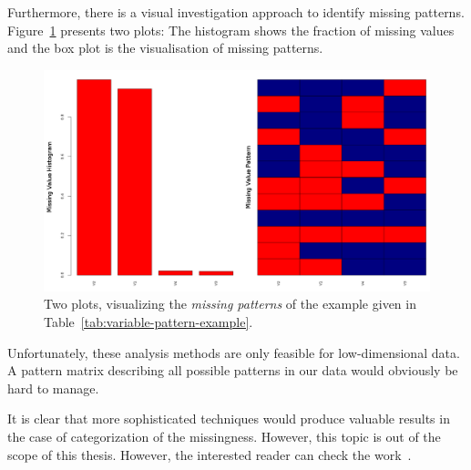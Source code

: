 Furthermore, there is a visual investigation approach to identify missing patterns. Figure~\ref{fig:missing-plot} presents two plots: The histogram shows the fraction of missing values and the box plot is the visualisation of missing patterns.

\begin{figure}[h!]
    \centering
    \includegraphics[scale=0.3]{Graphics/missing-pattern-plot.png}
    \caption{Two plots, visualizing the \textit{missing patterns} of the example given in Table~\ref{tab:variable-pattern-example}.}
    \label{fig:missing-plot}
\end{figure}

Unfortunately, these analysis methods are only feasible for low-dimensional data. A pattern matrix describing all possible patterns in our data would obviously be hard to manage.

It is clear that more sophisticated techniques would produce valuable results in the case of categorization of the missingness. However, this topic is out of the scope of this thesis. However, the interested reader can check the work~\cite{Mohan;Pearl:2014}.

